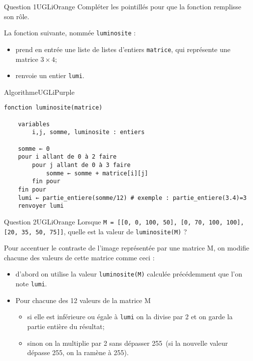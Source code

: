 \documentclass[a4paper,12pt,exos,firamath]{nsi}
\begin{document}
\begin{encadrecolore}{Question 1}{UGLiOrange}
Compléter les pointillés pour que la fonction remplisse son rôle.
\end{encadrecolore} 


La fonction suivante, nommée \texttt{luminosite} :
\begin{itemize}
	\item prend en entrée une liste de listes d'entiers \texttt{matrice}, qui représente une matrice $3\times 4$;
    \item renvoie un entier \texttt{lumi}.
\end{itemize}
\begin{encadrecolore}{Algorithme}{UGLiPurple}
\small
\begin{verbatim}    
fonction luminosite(matrice)
    
    variables
        i,j, somme, luminosite : entiers 

    somme ← 0
    pour i allant de 0 à 2 faire
        pour j allant de 0 à 3 faire
            somme ← somme + matrice[i][j]
        fin pour
    fin pour
    lumi ← partie_entiere(somme/12) # exemple : partie_entiere(3.4)=3
    renvoyer lumi
\end{verbatim}
\normalsize
\end{encadrecolore}
\begin{encadrecolore}{Question 2}{UGLiOrange}
Lorsque \texttt{M = [[0, 0, 100, 50], [0, 70, 100, 100], [20, 35, 50, 75]]}, quelle est la valeur de \texttt{luminosite(M)} ?
\end{encadrecolore} 


Pour accentuer le contraste de l'image représentée par une matrice M, on modifie chacune des valeurs de cette matrice comme ceci :
\begin{itemize}
	\item d'abord on utilise la valeur \texttt{luminosite(M)} calculée précédemment que l'on note \texttt{lumi}.
    \item Pour chacune des 12 valeurs de la matrice M
    \begin{itemize}
    	\item si elle est inférieure ou égale à \texttt{lumi} on la divise par 2 et on garde la partie entière du résultat;
        \item sinon on la multiplie par 2 sans dépasser 255 (si la nouvelle valeur dépasse 255, on la ramène à 255).   
    \end{itemize}    
\end{itemize}
\end{document}
